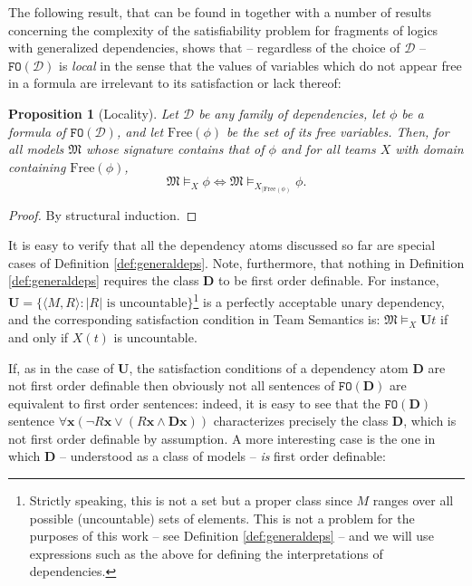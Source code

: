 \documentclass{article}
\newtheorem{Proposition}[Theorem]{Proposition}
\theoremstyle{definition}
\newcommand{\tuple}{\mathbf}
\newcommand{\FO}{\texttt{FO}}
\newcommand{\M}{\mathfrak M}
\newcommand{\D}{\mathbf D}
\newcommand{\DD}{\mathcal D}
\newcommand{\U}{\mathbf U}
\newcommand{\fv}{\text{Free}}
\begin{document}
The following result, that can be found in \cite{kontinen2016decidability} together with a number of results concerning the complexity of the satisfiability problem for fragments of logics with generalized dependencies, shows that -- regardless of the choice of $\DD$ -- $\FO(\DD)$ is \emph{local} in the sense that the values of variables which do not appear free in a formula are irrelevant to its satisfaction or lack thereof: 
\begin{Proposition}[Locality]
Let $\DD$ be any family of dependencies, let $\phi$ be a formula of $\FO(\DD)$, and let $\fv(\phi)$ be the set of its free variables. Then, for all models $\M$ whose signature contains that of $\phi$ and for all teams $X$ with domain containing $\fv(\phi)$, 
\[
	\M \models_X \phi \Leftrightarrow \M \models_{X_{|\fv(\phi)}} \phi. 
\]
\label{propo:local}
\end{Proposition}
\begin{proof}
By structural induction.
\end{proof}

It is easy to verify that all the dependency atoms discussed so far are special cases of Definition \ref{def:generaldeps}. Note, furthermore, that nothing in Definition \ref{def:generaldeps} requires the class $\D$ to be first order definable. For instance, $\U = \{\langle M, R\rangle : |R| \text{ is uncountable}\}$\footnote{Strictly speaking, this is not a set but a proper class since $M$ ranges over all possible (uncountable) sets of elements. This is not a problem for the purposes of this work -- see Definition \ref{def:generaldeps} --  and we will use expressions such as the above for defining the interpretations of dependencies.}  is a perfectly acceptable unary dependency, and the corresponding satisfaction condition in Team Semantics is: $\M \models_X \U t$ if and only if $X(t)$ is uncountable. 

If, as in the case of $\U$, the satisfaction conditions of a dependency atom $\D$ are not first order definable then obviously not all sentences of $\FO(\D)$ are equivalent to first order sentences: indeed, it is easy to see that the $\FO(\D)$ sentence $\forall \tuple x (\lnot R \tuple x \vee (R \tuple x \wedge \D \tuple x))$ characterizes precisely the class $\D$, which is not first order definable by assumption. A more interesting case is the one in which $\D$ -- understood as a class of models -- \emph{is} first order definable: 
\end{document}
